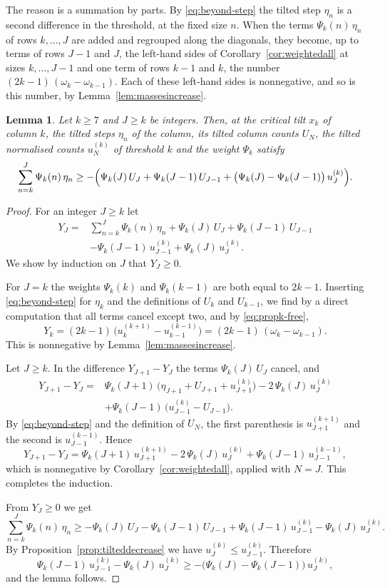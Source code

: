 \documentclass{amsart}
\newtheorem{lemma}[theorem]{Lemma}
\theoremstyle{definition}
\theoremstyle{remark}
\numberwithin{equation}{section}
\begin{document}
The reason is a summation by parts. By \eqref{eq:beyond-step} the tilted step
$\eta_n$ is a second difference in the threshold, at the fixed size $n$.
When the terms $\Psi_k(n)\,\eta_n$ of rows $k,\dots,J$ are added and
regrouped along the diagonals, they become, up to terms of rows $J-1$ and
$J$, the left-hand sides of Corollary~\ref{cor:weightedall} at sizes
$k,\dots,J-1$ and one term of rows $k-1$ and $k$, the number
$(2k-1)\,(\omega_k-\omega_{k-1})$. Each of these left-hand sides is
nonnegative, and so is this number, by Lemma~\ref{lem:massesincrease}.

\begin{lemma}\label{lem:debt}
Let $k\ge7$ and $J\ge k$ be integers. Then, at the critical tilt $x_k$ of
column $k$, the tilted steps $\eta_n$ of the column, its tilted column
counts $U_N$, the tilted normalised counts $u^{(k)}_N$ of threshold $k$ and
the weight $\Psi_k$ satisfy
\[
\sum_{n=k}^{J}\Psi_k(n)\,\eta_n\ge-\Bigl(\Psi_k(J)\,U_J
+\Psi_k(J-1)\,U_{J-1}
+\bigl(\Psi_k(J)-\Psi_k(J-1)\bigr)\,u^{(k)}_J\Bigr).
\]
\end{lemma}

\begin{proof}
For an integer $J\ge k$ let
\begin{align*}
Y_J={}&\sum_{n=k}^{J}\Psi_k(n)\,\eta_n+\Psi_k(J)\,U_J
+\Psi_k(J-1)\,U_{J-1}\\
&-\Psi_k(J-1)\,u^{(k)}_{J-1}+\Psi_k(J)\,u^{(k)}_J .
\end{align*}
We show by induction on $J$ that $Y_J\ge0$.

For $J=k$ the weights $\Psi_k(k)$ and $\Psi_k(k-1)$ are both equal to
$2k-1$. Inserting \eqref{eq:beyond-step} for $\eta_k$ and the definitions of
$U_k$ and $U_{k-1}$, we find by a direct computation that all terms cancel
except two, and by \eqref{eq:propk-free},
\[
Y_k=(2k-1)\,\bigl(u^{(k+1)}_k-u^{(k-1)}_{k-1}\bigr)
=(2k-1)\,(\omega_k-\omega_{k-1}) .
\]
This is nonnegative by Lemma~\ref{lem:massesincrease}.

Let $J\ge k$. In the difference $Y_{J+1}-Y_J$ the terms
$\Psi_k(J)\,U_J$ cancel, and
\begin{align*}
Y_{J+1}-Y_J={}&\Psi_k(J+1)\,
\bigl(\eta_{J+1}+U_{J+1}+u^{(k)}_{J+1}\bigr)-2\,\Psi_k(J)\,u^{(k)}_J\\
&+\Psi_k(J-1)\,\bigl(u^{(k)}_{J-1}-U_{J-1}\bigr).
\end{align*}
By \eqref{eq:beyond-step} and the definition of $U_N$, the first parenthesis
is $u^{(k+1)}_{J+1}$ and the second is $u^{(k-1)}_{J-1}$. Hence
\[
Y_{J+1}-Y_J=\Psi_k(J+1)\,u^{(k+1)}_{J+1}-2\,\Psi_k(J)\,u^{(k)}_J
+\Psi_k(J-1)\,u^{(k-1)}_{J-1},
\]
which is nonnegative by Corollary~\ref{cor:weightedall}, applied with
$N=J$. This completes the induction.

From $Y_J\ge0$ we get
\[
\sum_{n=k}^{J}\Psi_k(n)\,\eta_n\ge-\Psi_k(J)\,U_J-\Psi_k(J-1)\,U_{J-1}
+\Psi_k(J-1)\,u^{(k)}_{J-1}-\Psi_k(J)\,u^{(k)}_J .
\]
By Proposition~\ref{prop:tilteddecrease} we have
$u^{(k)}_J\le u^{(k)}_{J-1}$. Therefore
\[
\Psi_k(J-1)\,u^{(k)}_{J-1}-\Psi_k(J)\,u^{(k)}_J
\ge-\bigl(\Psi_k(J)-\Psi_k(J-1)\bigr)\,u^{(k)}_J ,
\]
and the lemma follows.
\end{proof}
\end{document}
